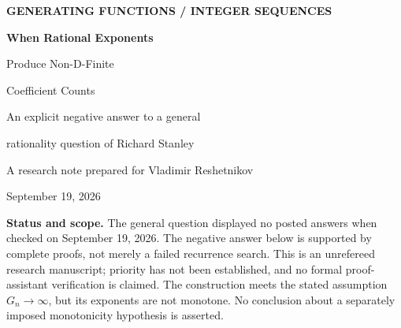 \documentclass[11pt,letterpaper]{article}
\numberwithin{equation}{section}
\theoremstyle{definition}
\theoremstyle{remark}
\begin{document}
\begin{titlepage}
\thispagestyle{empty}
\vspace*{0.3in}
{\sffamily\bfseries\color{Accent}\large GENERATING FUNCTIONS \; / \; INTEGER SEQUENCES\par}
\vspace{0.35in}
{\Huge\bfseries\color{Ink}When Rational Exponents\par Produce Non-D-Finite\par Coefficient Counts\par}
\vspace{0.28in}
{\Large An explicit negative answer to a general\par rationality question of Richard Stanley\par}
\vspace{0.35in}
{\large A research note prepared for Vladimir Reshetnikov\par}
{\color{Muted}September 19, 2026\par}
\vspace{0.4in}
\begin{abstract}
A 2022 MathOverflow question asks whether a positive integer sequence with a rational generating function necessarily gives rational generating functions for the numbers of coefficients equal to a fixed positive integer in its successive subset-sum products. We give a negative answer already for coefficients equal to one. The exponent sequence interleaves powers of two and three. Its generating function is rational, but if $a_n$ counts the coefficients equal to one after $2n$ factors, then
\[
 a_0=1,\qquad a_1=2,\qquad
 a_n=2^{\lfloor(n+1)(1-\log_3 2)\rfloor}\quad(n\ge2).
\]
We prove that these counts are not P-recursive and that their generating function has a natural boundary. More generally, interleaving powers of two and an integer $b\ge3$ gives a rational coefficient-count generating function if and only if $b$ is a power of two; in every other case it is not D-finite. All enumerative formulas follow from an elementary interval-cover argument and an exact analysis of digital carries. The package includes a standard-library Python verifier, independent polynomial and interval-sweep calculations, and integer sequence data.
\end{abstract}
\vfill
\begin{resultbox}
\textbf{Status and scope.} The general question displayed no posted answers when checked on September 19, 2026. The negative answer below is supported by complete proofs, not merely a failed recurrence search. This is an unrefereed research manuscript; priority has not been established, and no formal proof-assistant verification is claimed. The construction meets the stated assumption $G_n\to\infty$, but its exponents are not monotone. No conclusion about a separately imposed monotonicity hypothesis is asserted.
\end{resultbox}
\end{titlepage}
\end{document}
